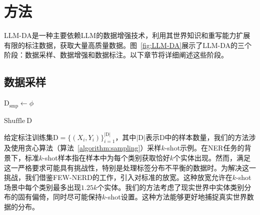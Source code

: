 \documentclass[supercite]{Experimental_Report}
\theoremstyle{definition}
\begin{document}
\section{方法}

LLM-DA是一种主要依赖LLM的数据增强技术，利用其世界知识和重写能力扩展有限的标注数据，获取大量高质量数据。图~\ref{fig:LLM-DA}展示了LLM-DA的三个阶段：数据采样、数据增强和数据标注。以下章节将详细阐述这些阶段。

\subsection{数据采样}

\begin{algorithm}[!t]
    \caption{数据采样的贪心算法}
    \label{algorithm:sampling}
    $\mathrm{D_{smp}} \gets \phi$ 
    

    $\mathrm{Shuffle~D}$

\end{algorithm}

给定标注训练集$\mathrm{D}=\{(X_i, Y_i)\}_{i=1}^{\vert \mathrm{D} \vert}$，其中$\vert \mathrm{D} \vert$表示$\mathrm{D}$中的样本数量，我们的方法涉及使用贪心算法（算法~\ref{algorithm:sampling}）采样$k$-shot示例。在NER任务的背景下，标准$k$-shot样本指在样本中为每个类别获取恰好$k$个实体出现。然而，满足这一严格要求可能具有挑战性，特别是处理标签分布不平衡的数据时。为解决这一挑战，我们借鉴FEW-NERD的工作\cite{Few-NERD}，引入对标准的放宽。这种放宽允许在$k$-shot场景中每个类别最多出现$1.25k$个实体。我们的方法考虑了现实世界中实体类别分布的固有偏倚，同时尽可能保持$k$-shot设置。这种方法能够更好地捕捉真实世界数据的分布。
\end{document}
